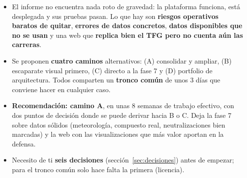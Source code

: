 \documentclass[11pt,openany]{report}
\begin{document}
\begin{titlepage}
\thispagestyle{empty}
\vspace*{5.4cm}


\bigskip
\begin{resumen}
\begin{itemize}
  \item El informe no encuentra nada roto de gravedad: la plataforma funciona, está desplegada y sus
  pruebas pasan. Lo que hay son \textbf{riesgos operativos baratos de quitar}, \textbf{errores de
  datos concretos}, \textbf{datos disponibles que no se usan} y una web que \textbf{replica bien el
  TFG pero no cuenta aún las carreras}.
  \item Se proponen \textbf{cuatro caminos} alternativos: (A) consolidar y ampliar, (B) escaparate
  visual primero, (C) directo a la fase 7 y (D) portfolio de arquitectura. Todos comparten un
  \textbf{tronco común} de unos 3 días que conviene hacer en cualquier caso.
  \item \textbf{Recomendación: camino A}, en unas 8 semanas de trabajo efectivo, con dos puntos de
  decisión donde se puede derivar hacia B o C. Deja la fase 7 sobre datos sólidos (meteorología,
  compuesto real, neutralizaciones bien marcadas) y la web con las visualizaciones que más valor
  aportan en la defensa.
  \item Necesito de ti \textbf{seis decisiones} (sección~\ref{sec:decisiones}) antes de empezar;
  para el tronco común solo hace falta la primera (licencia).
\end{itemize}
\end{resumen}
\vfill
\end{titlepage}
\end{document}
